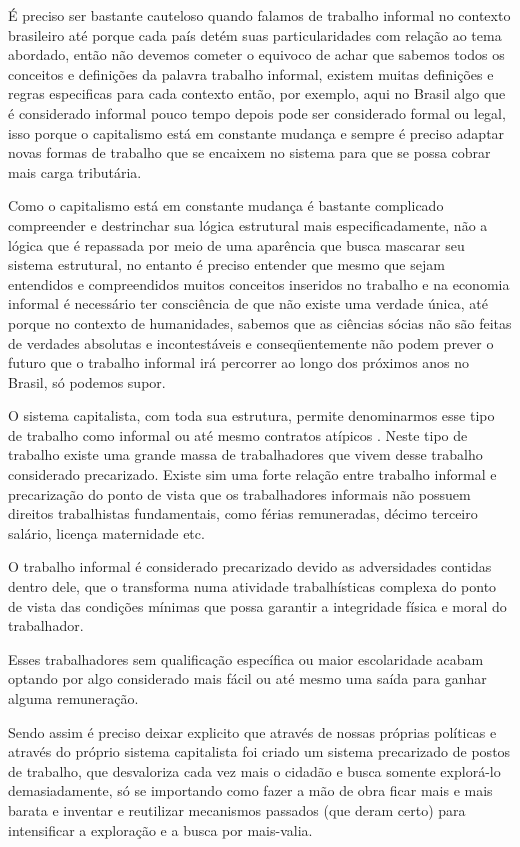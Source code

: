 É preciso ser bastante cauteloso quando falamos de trabalho informal no contexto brasileiro até porque cada país detém suas particularidades com relação ao tema abordado, então não devemos cometer o equivoco de achar que sabemos todos os conceitos e definições da palavra trabalho informal, existem muitas definições e regras especificas para cada contexto então, por exemplo, aqui no Brasil algo que é considerado informal pouco tempo depois pode ser considerado formal ou legal, isso porque o capitalismo está em constante mudança e sempre é preciso adaptar novas formas de trabalho que se encaixem no sistema para que se possa cobrar mais carga tributária.

Como o capitalismo está em constante mudança é bastante complicado compreender e destrinchar sua lógica estrutural mais especificadamente, não a lógica que é repassada por meio de uma aparência que busca mascarar seu sistema estrutural, no entanto é preciso entender que mesmo que sejam entendidos e compreendidos muitos conceitos inseridos no trabalho e na economia informal é necessário ter consciência de que não existe uma verdade única, até porque no contexto de humanidades, sabemos que as ciências sócias não são feitas de verdades absolutas e incontestáveis e conseqüentemente não podem prever o futuro que o trabalho informal irá percorrer ao longo dos próximos anos no Brasil, só podemos supor.

O sistema capitalista, com toda sua estrutura, permite denominarmos esse tipo de trabalho como informal ou até mesmo contratos atípicos \cite{noronha2003informal}. Neste tipo de trabalho existe uma grande massa de trabalhadores que vivem desse trabalho considerado precarizado. Existe sim uma forte relação entre trabalho informal e precarização do ponto de vista que os trabalhadores informais não possuem direitos trabalhistas fundamentais, como férias remuneradas, décimo terceiro salário, licença maternidade etc.

O trabalho informal é considerado precarizado devido as adversidades contidas dentro dele, que o transforma numa atividade trabalhísticas complexa do ponto de vista das condições mínimas que possa garantir a integridade física e moral do trabalhador.

Esses trabalhadores sem qualificação específica ou maior escolaridade acabam optando por algo considerado mais fácil ou até mesmo uma saída para ganhar alguma remuneração.

Sendo assim é preciso deixar explicito que através de nossas próprias políticas e através do próprio sistema capitalista foi criado um sistema precarizado de postos de trabalho, que desvaloriza cada vez mais o cidadão e busca somente explorá-lo demasiadamente, só se importando como fazer a mão de obra ficar mais e mais barata e inventar e reutilizar mecanismos passados (que deram certo) para intensificar a exploração e a busca por mais-valia.

